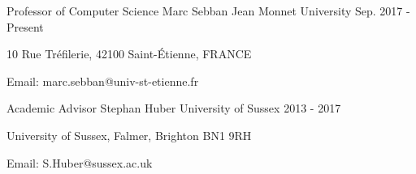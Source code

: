 \begin{cventries}
	\cventry
	{Professor of Computer Science	}
	{Marc Sebban}
	{Jean Monnet University}
	{Sep. 2017 - Present}
	{
		\begin{cvitems}
			\item {10 Rue Tréfilerie, 42100 Saint-Étienne, FRANCE}
			\item{Email: marc.sebban@univ-st-etienne.fr}
		\end{cvitems}
	}
	\cventry
	{Academic Advisor}
	{Stephan Huber}
	{University of Sussex}
	{2013 - 2017}
	{
		\begin{cvitems}
			\item {University of Sussex, Falmer, Brighton BN1 9RH}
			\item{Email: S.Huber@sussex.ac.uk}
		\end{cvitems}
	}
\end{cventries}
